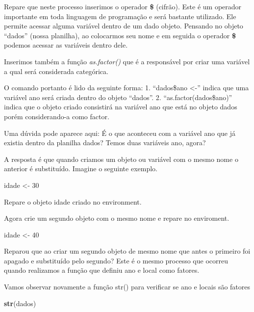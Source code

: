 \documentclass[]{book}
\newenvironment{Shaded}{\begin{snugshade}}{\end{snugshade}}
\newcommand{\DecValTok}[1]{\textcolor[rgb]{0.00,0.00,0.81}{#1}}
\newcommand{\KeywordTok}[1]{\textcolor[rgb]{0.13,0.29,0.53}{\textbf{#1}}}
\newcommand{\NormalTok}[1]{#1}
\newcommand{\StringTok}[1]{\textcolor[rgb]{0.31,0.60,0.02}{#1}}
\begin{document}
Repare que neste processo inserimos o operador \textbf{\$} (cifrão). Este é um operador importante em toda linguagem de programação e será bastante utilizado. Ele permite acessar alguma variável dentro de um dado objeto. Pensando no objeto ``dados'' (nossa planilha), ao colocarmos seu nome e em seguida o operador \textbf{\$} podemos acessar as variáveis dentro dele.

Inserimos também a função \emph{as.factor()} que é a responsável por criar uma variável a qual será considerada categórica.

O comando portanto é lido da seguinte forma:
1. ``dados\$ano \textless{}-'' indica que uma variável ano será criada dentro do objeto ``dados''.
2. ``as.factor(dados\$ano)'' indica que o objeto criado consistirá na variável ano que está no objeto dados porém considerando-a como factor.

Uma dúvida pode aparece aqui: É o que aconteceu com a variável ano que já existia dentro da planilha dados? Temos duas variáveis ano, agora?

A resposta é que quando criamos um objeto ou variável com o mesmo nome o anterior é substituído. Imagine o seguinte exemplo.

\begin{Shaded}
\begin{Highlighting}[]
\NormalTok{idade <-}\StringTok{ }\DecValTok{30}
\end{Highlighting}
\end{Shaded}

Repare o objeto idade criado no environment.

Agora crie um segundo objeto com o mesmo nome e repare no enviroment.

\begin{Shaded}
\begin{Highlighting}[]
\NormalTok{idade <-}\StringTok{ }\DecValTok{40}
\end{Highlighting}
\end{Shaded}

Reparou que ao criar um segundo objeto de mesmo nome que antes o primeiro foi apagado e substituído pelo segundo? Este é o mesmo processo que ocorreu quando realizamos a função que definiu ano e local como fatores.

Vamos observar novamente a função str() para verificar se ano e locais são fatores

\begin{Shaded}
\begin{Highlighting}[]
\KeywordTok{str}\NormalTok{(dados)}
\end{Highlighting}
\end{Shaded}
\end{document}
